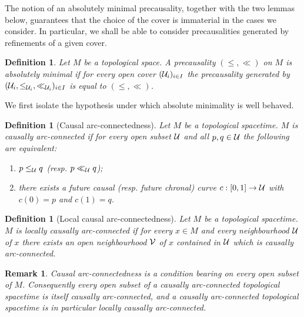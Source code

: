 \documentclass[a4paper,twoside]{article}
\newtheorem{defi}[lem]{Definition}
\newtheorem{rem}[lem]{Remark}
\begin{document}
The notion of an absolutely minimal precausality, together with the two lemmas below, guarantees that the choice of the cover is immaterial in the cases we consider. In particular, we shall be able to consider precausalities generated by refinements of a given cover.
\begin{defi} Let $M$ be a topological space.
A precausality $(\leq,\ll)$ on $M$ is absolutely minimal if for every open cover $(\mathcal{U}_i)_{i\in I}$ the precausality generated by $(\mathcal{U}_i,\leq_{\mathcal{U}_i}, \ll_{\mathcal{U}_i})_{i\in I}$ is equal to $(\leq,\ll)$.
\end{defi}

We first isolate the hypothesis under which absolute minimality is well behaved.

\begin{defi}[Causal arc-connectedness] Let $M$ be a topological spacetime. $M$ is causally arc-connected if for every open subset
$\mathcal{U}$ and all $p,q\in \mathcal{U}$ the following are equivalent:
\begin{enumerate}[label=(\roman*)]
\item $p\leq_{\mathcal{U}} q$ (resp. $p\ll_{\mathcal{U}} q$);
\item there exists a future causal (resp. future chronal) curve $c:[0,1]\rightarrow \mathcal{U}$ with $c(0)=p$ and $c(1)=q$.
\end{enumerate}
\end{defi}

\begin{defi}[Local causal arc-connectedness] Let $M$ be a topological spacetime.
$M$ is locally causally arc-connected if for every $x\in M$ and every neighbourhood $\mathcal{U}$ of $x$ there
exists an open neighbourhood $\mathcal V$ of $x$ contained in $\mathcal{U}$ which is causally arc-connected.
\end{defi}
\begin{rem}\label{rem:cac_local} Causal arc-connectedness is a condition bearing on \emph{every} open subset of $M$.
Consequently every open subset of a causally arc-connected topological spacetime is itself
causally arc-connected, and a causally arc-connected topological spacetime is in particular
locally causally arc-connected.
\end{rem}
\end{document}

